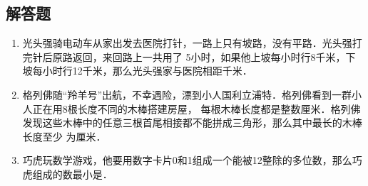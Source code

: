 \documentclass{ctexart}
\newcommand{\tk}{\underline{\hspace{2cm}}}
\begin{document}
        \subsection{解答题}
        \begin{enumerate}[resume]
        \item 光头强骑电动车从家出发去医院打针，一路上只有坡路，没有平路．光头强打完针后原路返回，来回路上一共用了
        5小时，如果他上坡每小时行8千米，下坡每小时行12千米，那么光头强家与医院相距\tk 千米．
        \vspace{4cm}
        \item 格列佛随“羚羊号”出航，不幸遇险，漂到小人国利立浦特．格列佛看到一群小人正在用8根长度不同的木棒搭建房屋，
        每根木棒长度都是整数厘米．格列佛发现这些木棒中的任意三根首尾相接都不能拼成三角形，那么其中最长的木棒长度至少
        为\tk 厘米．
        \vspace{4cm}
        \item 巧虎玩数学游戏，他要用数字卡片0和1组成一个能被12整除的多位数，那么巧虎组成的数最小是\tk ．
        
    \end{enumerate}
\end{document}
